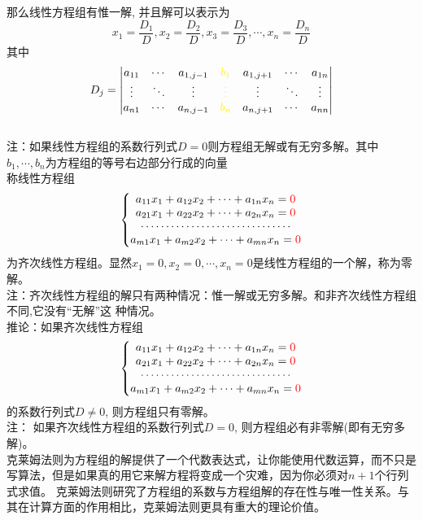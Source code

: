 那么线性方程组有惟一解, 并且解可以表示为
$$
{{x}_{1}}=\frac{{{D}_{1}}}{D},
{{x}_{2}}=\frac{{{D}_{2}}}{D},
{{x}_{3}}=\frac{{{D}_{3}}}{D},\cdots,
{{x}_{n}}=\frac{{{D}_{n}}}{D}
$$
其中
$$
{{D}_{j}}=\left| \begin{matrix}
{{a}_{11}} & \cdots  & {{a}_{1,j-1}} & {\color{yellow}{{b}_{1}}} & {{a}_{1,j+1}} & \cdots  & {{a}_{1n}}  \\
\vdots  & {\ddots} & \vdots          & {\color{yellow}\vdots}  & \vdots  & {\ddots} & \vdots   \\
{{a}_{n1}} & \cdots  & {{a}_{n,j-1}} & {\color{yellow}{{b}_{n}}} & {{a}_{n,j+1}} & \cdots  & {{a}_{nn}}  \\
\end{matrix} \right| 
$$
\\
{\color{red}注：}如果线性方程组的系数行列式$D=0$则方程组无解或有无穷多解。其中$b_{1},\cdots,b_{n}$为方程组的等号右边部分行成的向量\\
称线性方程组 \\
$$
\left\{ \begin{matrix}
{{a}_{11}}{{x}_{1}}+{{a}_{12}}{{x}_{2}}+\cdots +{{a}_{1n}}{{x}_{n}}={\color{red}0}  \\
{{a}_{21}}{{x}_{1}}+{{a}_{22}}{{x}_{2}}+\cdots +{{a}_{2n}}{{x}_{n}}={\color{red}0}  \\
\cdots \cdots \cdots \cdots \cdots \cdots \cdots \cdots \cdots \cdots   \\
{{a}_{m1}}{{x}_{1}}+{{a}_{m2}}{{x}_{2}}+\cdots +{{a}_{mn}}{{x}_{n}}={\color{red}0}  \\
\end{matrix} \right. 
$$
为{\color{red}齐次}线性方程组。显然$x_{1}=0,x_{2}=0,\cdots,x_{n}=0$是线性方程组的一个解，称为{\color{blue}零解}。\\
{\color{red}注：}齐次线性方程组的解只有两种情况：惟一解或无穷多解。和非齐次线性方程组不同,它没有“无解”这
种情况。\\
{\color{blue}推论：}如果齐次线性方程组
$$
\left\{ \begin{matrix}
{{a}_{11}}{{x}_{1}}+{{a}_{12}}{{x}_{2}}+\cdots +{{a}_{1n}}{{x}_{n}}={\color{red}0}  \\
{{a}_{21}}{{x}_{1}}+{{a}_{22}}{{x}_{2}}+\cdots +{{a}_{2n}}{{x}_{n}}={\color{red}0}  \\
\cdots \cdots \cdots \cdots \cdots \cdots \cdots \cdots \cdots \cdots   \\
{{a}_{m1}}{{x}_{1}}+{{a}_{m2}}{{x}_{2}}+\cdots +{{a}_{mn}}{{x}_{n}}={\color{red}0}  \\
\end{matrix} \right. 
$$
的系数行列式$D\ne 0$,  则方程组只有零解。\\
{\color{red}注：} 如果齐次线性方程组的系数行列式$D=0$, 则方程组必有非零解(即有无穷多解)。\\
克莱姆法则为方程组的解提供了一个代数表达式，让你能使用代数运算，而不只是写算法，但是如果真的用它来解方程将变成一个灾难，因为你必须对$n+1$个行列式求值。
克莱姆法则研究了方程组的系数与方程组解的存在性与唯一性关系。与其在计算方面的作用相比，克莱姆法则更具有重大的理论价值。